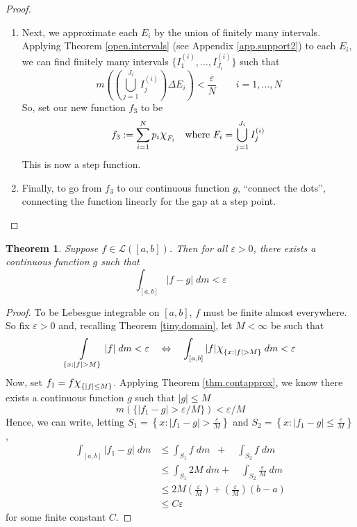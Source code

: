 \documentclass[12pt]{article}
\theoremstyle{plain}
\newtheorem{thm}{Theorem}[subsection]
\theoremstyle{definition}
\theoremstyle{remark}
\newcommand*{\Chi}{\mbox{\large$\chi$}} %
\begin{document}
\begin{proof}
\begin{enumerate}
\item Next, we approximate each $E_i$ by the union of finitely many intervals. Applying Theorem \ref{open.intervals} (see Appendix \ref{app.support2}) to each $E_i$, we can find finitely many intervals $\{I^{(i)}_1,\ldots,I^{(i)}_{J_i}\}$ such that  
\[
    m\left(\left(\bigcup^{J_i}_{j=1} I^{(i)}_j \right)
    \Delta E_i\right) < \frac{\varepsilon}{N}
    \qquad i = 1, \ldots,N
\]
So, set our new function $f_3$ to be 
\[
    f_3 := \sum^N_{i=1} p_i 
    \Chi_{F_i}
    \quad \text{where }
    F_i = \bigcup^{J_i}_{j=1} I_j^{(i)}
\]
This is now a step function. 

\item Finally, to go from $f_3$ to our continuous function $g$, ``connect the dots'', connecting the function linearly for the gap at a step point.

\end{enumerate}

\end{proof}

\begin{thm}
\label{thm.contchoose}
Suppose $f\in\mathscr{L}([a,b])$. Then for all $\varepsilon>0$, there exists a continuous function $g$ such that 
\[
    \int_{[a,b]} |f-g| \; dm < \varepsilon
\]
\end{thm}
\begin{proof}
To be Lebesgue integrable on $[a,b]$, $f$ must be finite almost everywhere. So fix $\varepsilon>0$ and, recalling Theorem \ref{tiny.domain}, let $M<\infty$ be such that 
\[
    \int\limits_{\{x:|f|>M\}} |f|\; dm<\varepsilon
    \quad\Leftrightarrow\quad
    \int_{[a,b]} |f|\Chi_{\{x:|f|>M\}}\; dm <\varepsilon
\]
Now, set $f_1=f\Chi_{\{|f|\leq M\}}$. Applying Theorem \ref{thm.contapprox}, we know there exists a continuous function $g$ such that $|g|\leq M$
\[
   m(\{|f_1-g| > \varepsilon/M\}) <\varepsilon/M 
\]
Hence, we can write, letting $S_1=\left\{x:|f_1-g|>\frac{\varepsilon}{M}\right\}$ and $S_2=\left\{x:|f_1-g|\leq\frac{\varepsilon}{M}\right\}$,
\begin{align*}
    \int_{[a,b]} |f_1-g|\; dm &\leq 
    \int_{S_1} f\; dm \;\;+\quad
    \int_{S_2} f\; dm \\
    &\leq 
    \int_{S_1} 2M\; dm +\quad 
    \int_{S_2} \frac{\varepsilon}{M}\; dm \\
    &\leq 2M\left(\frac{\varepsilon}{M}\right) + 
    \left(\frac{\varepsilon}{M}\right)(b-a) \\
    &\leq C\varepsilon
\end{align*}
for some finite constant $C$.

\end{proof}
\end{document}
